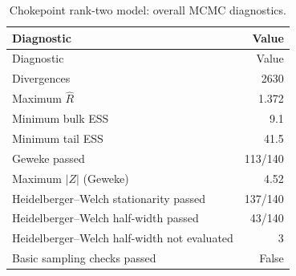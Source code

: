 \documentclass[pdftex,12pt,openright,a4paper,oneside]{book}
\begin{document}
\begin{longtable}{@{}p{}r@{}}

\caption{Chokepoint rank-two model: overall MCMC diagnostics.}\label{tab:chokepoint_rank2_diagnostics}\\

\toprule

Diagnostic & Value \\

\midrule\endfirsthead

\toprule

Diagnostic & Value \\

\midrule\endhead

Divergences & 2630 \\

Maximum $\widehat R$ & 1.372 \\

Minimum bulk ESS & 9.1 \\

Minimum tail ESS & 41.5 \\

Geweke passed & 113/140 \\

Maximum $|Z|$ (Geweke) & 4.52 \\

Heidelberger--Welch stationarity passed & 137/140 \\

Heidelberger--Welch half-width passed & 43/140 \\

Heidelberger--Welch half-width not evaluated & 3 \\

Basic sampling checks passed & False \\

\bottomrule\end{longtable}
\end{document}

